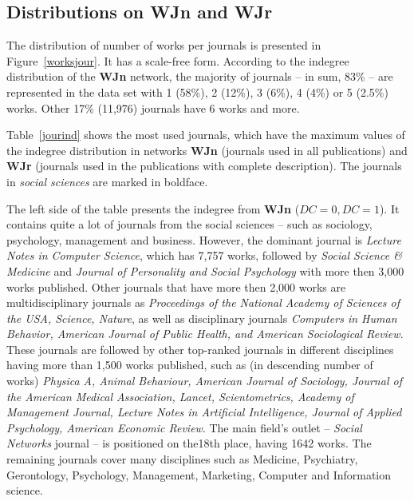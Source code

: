 \documentclass[11pt]{article} %
\begin{document}
\subsection{Distributions on WJn and WJr}

The distribution of number of works per journals is presented in Figure~\ref{worksjour}. It has a scale-free form. According to the indegree distribution of the \textbf{WJn} network, the majority of journals -- in sum, 83\% -- are represented  in the data set with 1 (58\%), 2 (12\%), 3 (6\%), 4 (4\%) or 5 (2.5\%) works. Other 17\% (11,976) journals have 6 works and more. \medskip

Table~\ref{jourind} shows the most used journals, which have the maximum values of the indegree distribution in networks \textbf{WJn} (journals used in all publications) and \textbf{WJr} (journals used in the publications with complete description). The journals in \textit{social sciences} are marked in boldface. \medskip 

The left side of the table presents the indegree from \textbf{WJn} ($DC=0, DC=1$). It contains quite a lot of journals from the social sciences -- such as sociology, psychology, management and business. However, the dominant journal is \textit{Lecture Notes in Computer Science}, which has 7,757 works, followed by \textit{Social Science \& Medicine} and \textit{Journal of Personality and Social Psychology} with more then 3,000 works published. Other journals that have more then 2,000 works are multidisciplinary journals as \textit{Proceedings of the National Academy of Sciences of the USA, Science, Nature}, as well as disciplinary journals \textit{Computers in Human Behavior, American Journal of Public Health, and American Sociological Review}. These journals are followed by other top-ranked journals in different disciplines having more than 1,500 works published, such as (in descending number of works) \textit{Physica A, Animal Behaviour, American Journal of Sociology, Journal of the American Medical Association,  Lancet, Scientometrics, Academy of Management Journal, Lecture Notes in Artificial Intelligence, Journal of Applied Psychology, American Economic Review}. The main field's outlet -- \textit{Social Networks} journal -- is positioned on the18th place, having 1642 works. The remaining journals cover many disciplines such as  Medicine, Psychiatry, Gerontology, Psychology, Management, Marketing, Computer and Information science. \medskip
\end{document}
